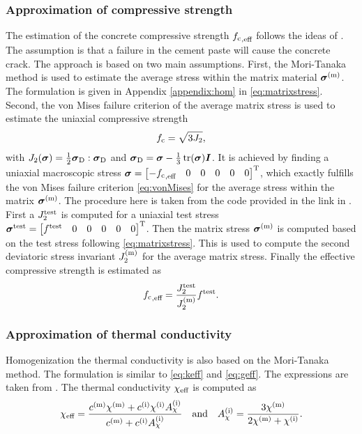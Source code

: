 \subsubsection{Approximation of compressive strength}
The estimation of the concrete compressive strength ${f_{\text{c}}}_{,\text{eff}}$ follows the ideas of \cite{nev_2018_mcam}.
The assumption is that a failure in the cement paste will cause the concrete crack.
The approach is based on two main assumptions.
First, the Mori-Tanaka method is used to estimate the average stress within the matrix material $\boldsymbol{\sigma}^{(\text{m})}$. 
The formulation is given in Appendix \ref{appendix:hom} in \eqref{eq:matrixstress}.
Second, the von Mises failure criterion of the average matrix stress is used to estimate the uniaxial compressive strength
\begin{align}
{f_{\text{c}}} = \sqrt{3 J_2},  \label{eq:vonMises}
\end{align}
with $J_2(\boldsymbol{\sigma}) = \frac{1}{2} \boldsymbol{\sigma}_{\text{D}}:\boldsymbol{\sigma}_{\text{D}}$ and $\boldsymbol{\sigma}_{\text{D}} = \boldsymbol{\sigma} - \frac{1}{3}\operatorname{tr}(\boldsymbol{\sigma})\boldsymbol{I}$.
It is achieved by finding a uniaxial macroscopic stress $\boldsymbol{\sigma} = \begin{bmatrix} -{f_{\text{c}}}_{,\text{eff}} & 0 & 0 &0&0&0 \end{bmatrix}^\text{T}$, which exactly fulfills the von Mises failure criterion \eqref{eq:vonMises} for the average stress within the matrix $\boldsymbol{\sigma}^{(\text{m})}$.
The procedure here is taken from the code provided in the link in \cite{nee_2012_ammf}.
First a $J_2^{\text{test}}$ is computed for a uniaxial test stress $\boldsymbol{\sigma}^{\text{test}} = \begin{bmatrix} f^{\text{test}} & 0 & 0 &0&0&0 \end{bmatrix}^\text{T}$. 
Then the matrix stress $\boldsymbol{\sigma}^{(\text{m})}$ is computed based on the test stress following \eqref{eq:matrixstress}. 
This is used to compute the second deviatoric stress invariant $J_2^{(\text{m})}$ for the average matrix stress.
Finally the effective compressive strength is estimated as
\begin{align}
	{f_{\text{c}}}_{,\text{eff}} = \frac{J_2^{\text{test}}}{J_2^{(\text{m})}} f^{\text{test}}.
\end{align}
\subsubsection{Approximation of thermal conductivity }
Homogenization the thermal conductivity is also based on the Mori-Tanaka method.
The formulation is similar to \eqref{eq:keff} and \eqref{eq:geff}.
The expressions are taken from \cite{str_2011_mbeo}.
The thermal conductivity $\chi_{\text{eff}}$ is computed as
\begin{align}
	\chi_{\text{eff}} = \dfrac{c^{(\text{m})}\chi^{(\text{m})} + c^{(\text{i})} \chi^{(\text{i})} A_{\chi}^{(\text{i})}}{c^{(\text{m})} +  c^{(\text{i})} A_{\chi}^{(\text{i})}}\quad\text{and}\quad
	A_{\chi}^{(\text{i})} = \frac{3\chi^{(\text{m})}}{2\chi^{(\text{m})}+\chi^{(\text{i})}}.
\end{align}